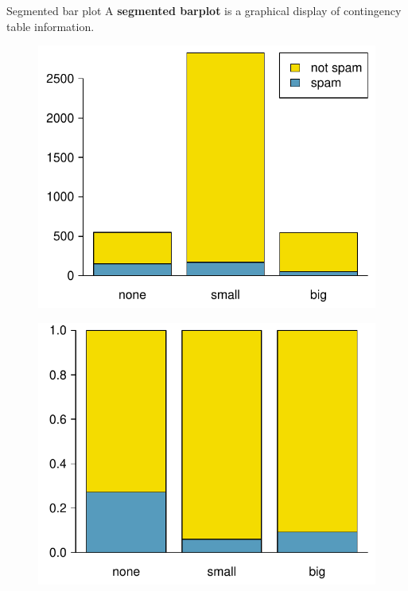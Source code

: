 \documentclass[12pt,a4paper]{beamer}
\begin{document}
\begin{frame}{Segmented bar plot}
	A \textbf{segmented barplot} is a graphical display of contingency table information.
	\begin{figure}
	 	\centering
		\begin{minipage}{.5\textwidth}
		  \centering
	\includegraphics[width=\textwidth]{figures/emailSpamNumberSegBar/emailSpamNumberSegBar}
	\end{minipage}%
	\begin{minipage}{.5\textwidth}
	  \centering
\includegraphics[width=\textwidth]{figures/emailSpamNumberSegBar/emailSpamNumberSegBarSta}
\label{emailSpamNumberSegBarSta}
\end{minipage}
\end{figure}
\end{frame}
\end{document}
